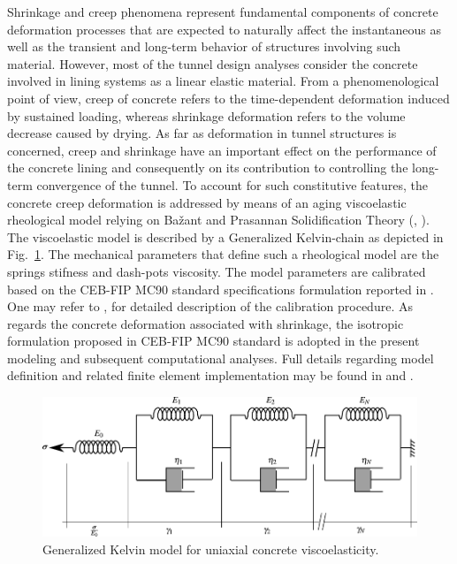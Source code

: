 \documentclass[Journal,letterpaper, NoLists,SectionNumbers]{ascelike-new}
\begin{document}
Shrinkage and creep phenomena represent fundamental components of concrete deformation processes that are expected to naturally affect the instantaneous as well as the transient and long-term behavior of structures involving such material. However, most of the tunnel design analyses consider the concrete involved in lining systems as a linear elastic material. From a phenomenological point of view, creep of concrete refers to the time-dependent deformation induced by sustained loading, whereas shrinkage deformation refers to the volume decrease caused by drying. As far as deformation in tunnel structures is concerned, creep and shrinkage have an important effect on the performance of the concrete lining and consequently on its contribution to controlling the long-term convergence of the tunnel. To account for such constitutive features, the concrete creep deformation is addressed by means of an aging viscoelastic rheological model relying on Bažant and Prasannan Solidification Theory (,  ). The viscoelastic model is described by a Generalized Kelvin-chain as depicted in Fig.~\ref{reological_representation_concrete}. The mechanical parameters that define such a rheological model are the springs stifness and dash-pots viscosity. The model parameters are calibrated based on the CEB-FIP MC90 standard specifications formulation reported in . One may refer to ,  for detailed description of the calibration procedure. As regards the concrete deformation associated with shrinkage, the isotropic formulation proposed in CEB-FIP MC90 standard \citeyear{CEB:1993} is adopted in the present modeling and subsequent computational analyses. Full details regarding model definition and related finite element implementation may be found in  and .

\begin{figure}[h!]
	\centering
	\includegraphics[scale=1]{Rheological_representation_concrete.pdf}
	\caption{Generalized Kelvin model for uniaxial concrete viscoelasticity.}
	\label{reological_representation_concrete}
\end{figure}
\end{document}

